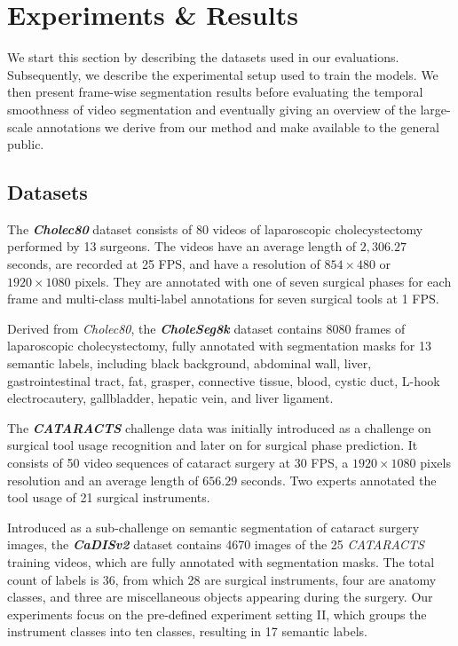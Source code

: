 \section{Experiments \& Results}
\label{sec:exp}

We start this section by describing the datasets used in our evaluations.
Subsequently, we describe the experimental setup used to train the models.
We then present frame-wise segmentation results before evaluating the temporal smoothness of video segmentation and eventually giving an overview of the large-scale annotations we derive from our method and make available to the general public. 

%
%
%

\subsection{Datasets}

The \textbf{\emph{Cholec80}} dataset \cite{twinanda2016endonet} consists of 80 videos of laparoscopic cholecystectomy performed by 13 surgeons. The videos have an average length of $2,306.27$ seconds, are recorded at 25 FPS, and have a resolution of $854 \times 480$ or $1920 \times 1080$ pixels. They are annotated with one of seven surgical phases for each frame and multi-class multi-label annotations for seven surgical tools at 1 FPS.

Derived from \emph{Cholec80}, the \textbf{\emph{CholeSeg8k}} dataset \cite{hong2020cholecseg8k} contains 8080 frames of laparoscopic cholecystectomy, fully annotated with segmentation masks for 13 semantic labels, including black background, abdominal wall, liver, gastrointestinal tract, fat, grasper, connective tissue, blood, cystic duct, L-hook electrocautery, gallbladder, hepatic vein, and liver ligament.

The \textbf{\emph{CATARACTS}} challenge data \cite{al2019cataracts} was initially introduced as a challenge on surgical tool usage recognition and later on for surgical phase prediction. It consists of 50 video sequences of cataract surgery at 30 FPS, a $1920 \times 1080$ pixels resolution and an average length of $656.29$ seconds. Two experts annotated the tool usage of 21 surgical instruments. 

Introduced as a sub-challenge on semantic segmentation of cataract surgery images, the \textbf{\emph{CaDISv2}} dataset \cite{grammatikopoulou2021cadis} contains 4670 images of the 25 \emph{CATARACTS} training videos, which are fully annotated with segmentation masks. The total count of labels is 36, from which 28 are surgical instruments, four are anatomy classes, and three are miscellaneous objects appearing during the surgery. Our experiments focus on the pre-defined experiment setting II, which groups the instrument classes into ten classes, resulting in 17 semantic labels. 

